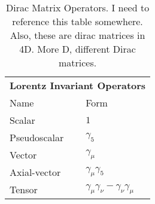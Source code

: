 %
%
%
\begin{table}[h!!!!t]
	\begin{center}
	\begin{tabular}{ l  l}
		\multicolumn{2}{l}{ \textbf{Lorentz Invariant Operators}}
		\\  %
		\multicolumn{1}{l}{Name} 		& \multicolumn{1}{l}{ Form}   %
		\\  \hline
		Scalar 			   				& $1$																			
		\\
		Pseudoscalar \;\;\;\;\;\;\;\;\;	& $\gamma_5$						 						
		\\
		Vector							& $\gamma_\mu$												
		\\
		Axial-vector					& $\gamma_\mu \gamma_5$											
		\\
		Tensor							& $\gamma_\mu \gamma_\nu - \gamma_\nu \gamma_\mu$										
		\\  \hline
	\end{tabular}
	\end{center}
	\caption[Dirac Matrix Operators]{Dirac Matrix Operators.  I need to reference this table somewhere.  Also, these are dirac matrices in 4D.  More D, different Dirac matrices.}
	\label{table:dirac_matrix_operators}
\end{table}
